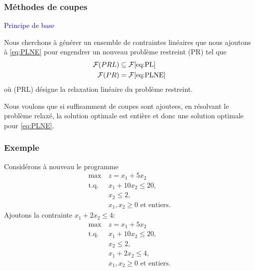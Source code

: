 \documentclass[usepdftitle=false]{beamer}
\def\cF{\mathcal{F}}
\def\st{\mbox{t.q. }}
\begin{document}
\begin{frame}
\frametitle{Méthodes de coupes}

\textcolor{blue}{Principe de base}

\mbox{}

Nous cherchons à générer un ensemble de contraintes
linéaires que nous ajoutons à \eqref{eq:PLNE}
pour engendrer un nouveau
problème restreint (PR) tel que
\begin{align*}
\cF{(PRL)} &\subseteq \cF \eqref{eq:PL} \\
\cF{(PR)} &= \cF\eqref{eq:PLNE}
\end{align*}
où (PRL) désigne la relaxation linéaire du problème restreint.

\mbox{}

Nous voulons que si suffisamment de coupes sont ajoutees, en résolvant le problème relaxé, la solution optimale est entière et donc une solution optimale pour \eqref{eq:PLNE}.

\end{frame}

\begin{frame}
\frametitle{Exemple}

Considérons à nouveau le programme
\begin{align*}
	\max\ & z = x_1+5x_2\\
	\st & x_1+10x_2 \leq 20, \\
	& x_2 \leq 2, \\
	& x_1, x_2 \geq 0 \mbox{ et entiers}.
\end{align*}
Ajoutons la contrainte $x_1 + 2x_2 \leq 4$:
\begin{align*}
	\max\ & z = x_1+5x_2\\
	\st & x_1+10x_2 \leq 20, \\
	& x_2 \leq 2, \\
	& x_1 + 2x_2 \leq 4, \\
	& x_1, x_2 \geq 0 \mbox{ et entiers}.
\end{align*}

\end{frame}
\end{document}

